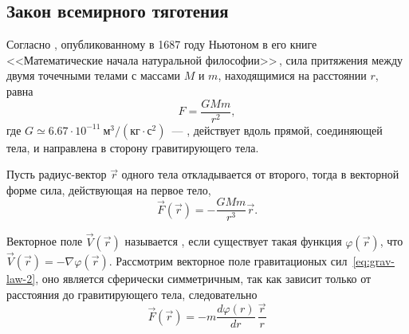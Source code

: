 \subsection{Закон всемирного тяготения}
Согласно , опубликованному в 1687 году Ньютоном в его книге <<Математические начала натуральной философии>>\,\cite{newton1687philosophiae}\cite{newton1846philosophiaeEnglish}, сила притяжения между двумя точечными телами с массами $M$ и $m$, находящимися на расстоянии $r$, равна
\begin{equation}
	F=\frac{GMm}{r^2}, 
	\label{eq:grav-law-1}
\end{equation}\nopagebreak где $G\simeq 6.67\cdot 10^{-11}~\text{м}^3 /\left( \text{кг} \cdot \text{с}^2 \right)$~---  , действует вдоль прямой, соединяющей тела, и направлена в сторону гравитирующего тела.

Пусть радиус-вектор $\vec r$ одного тела откладывается от второго, тогда в векторной форме сила, действующая на первое тело,
\begin{equation}
	\vec F (\vec r) = -\frac{GMm}{r^3} \vec r. 
	\label{eq:grav-law-2}
\end{equation}

Векторное поле $\vec V (\vec r)$ называется , если существует такая функция $\varphi(\vec r)$, что $\vec V (\vec r) = - \nabla \varphi(\vec r)$. Рассмотрим векторное поле гравитационых сил~\eqref{eq:grav-law-2}, оно является сферически симметричным, так как зависит только от расстояния до гравитирующего тела, следовательно
\begin{equation*}
	\vec F (\vec r) = -m \frac{d\varphi(r)}{dr} \, \frac{\vec{r}}{r}
\end{equation*} 

